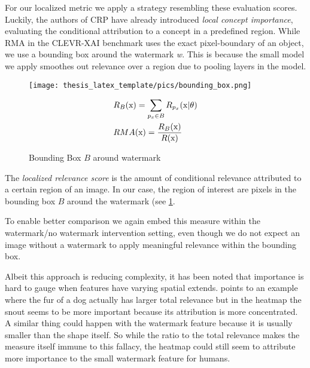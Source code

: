 For our localized metric we apply a strategy resembling these evaluation scores. 
Luckily, the authors of CRP have already introduced \textit{local concept importance}, evaluating the conditional attribution to a concept in a predefined region. 
While RMA in the CLEVR-XAI benchmark uses the exact pixel-boundary of an object, we use a bounding box around the watermark \textit{w}. This is because the small model we apply smoothes out relevance over a region due to pooling layers in the model. \\

\begin{figure}
\begin{minipage}[t]{0.45\textwidth}
    \vspace{-\topskip}
        \texttt{[image: thesis\_latex\_template/pics/bounding\_box.png]}
\end{minipage}
\begin{minipage}[t]{0.45\textwidth}
    \begin{align}\displaystyle
    & R_B(\mathrm{x}) = \sum_{p_x \in B} R_{p_x}(\mathrm{x} | \theta)\\
    & RMA(\mathrm{x}) = \frac{R_B(\mathrm{x})}{R(\mathrm{x})}
    \end{align}
\end{minipage}
\caption{Bounding Box $B$ around watermark}
\label{fig:bounding_box}
\end{figure}


The \textit{localized relevance score} is the amount of conditional relevance attributed to a certain region of an image. In our case, the region of interest are pixels in the bounding box $B$ around the watermark (see \cref{fig:bounding_box}. 


To enable better comparison we again embed this measure within the watermark/no watermark intervention setting, even though we do not expect an image without a watermark to apply meaningful relevance within the bounding box.

Albeit this approach is reducing complexity, it has been noted that importance is hard to gauge when features have varying spatial extends. \cite{Achtibat2022} points to an example where the fur of a dog actually has larger total relevance but in the heatmap the snout seems to be more important because its attribution is more concentrated. A similar thing could happen with the watermark feature because it is usually smaller than the shape itself. So while the ratio to the total relevance makes the measure itself immune to this fallacy, the heatmap could still seem to attribute more importance to the small watermark feature for humans. \\

